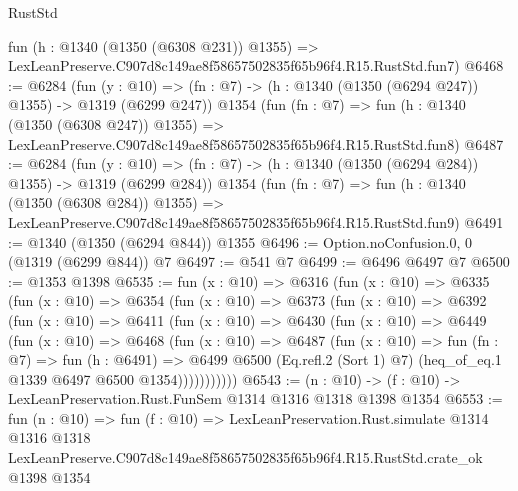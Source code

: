\begin{lexlean}{RustStd}
\begin{coremodule}
    fun (h : @1340 (@1350 (@6308 @231)) @1355) =>
    LexLeanPreserve.C907d8c149ae8f58657502835f65b96f4.R15.RustStd.fun7)
@6468 := @6284
    (fun (y : @10) => (fn : @7) -> (h : @1340 (@1350 (@6294 @247)) @1355) -> @1319 (@6299 @247))
    @1354
    (fun (fn : @7) =>
    fun (h : @1340 (@1350 (@6308 @247)) @1355) =>
    LexLeanPreserve.C907d8c149ae8f58657502835f65b96f4.R15.RustStd.fun8)
@6487 := @6284
    (fun (y : @10) => (fn : @7) -> (h : @1340 (@1350 (@6294 @284)) @1355) -> @1319 (@6299 @284))
    @1354
    (fun (fn : @7) =>
    fun (h : @1340 (@1350 (@6308 @284)) @1355) =>
    LexLeanPreserve.C907d8c149ae8f58657502835f65b96f4.R15.RustStd.fun9)
@6491 := @1340 (@1350 (@6294 @844)) @1355
@6496 := Option.noConfusion.{0, 0} (@1319 (@6299 @844)) @7
@6497 := @541 @7
@6499 := @6496 @6497 @7
@6500 := @1353 @1398
@6535 := fun (x : @10) =>
  @6316
    (fun (x : @10) =>
    @6335
      (fun (x : @10) =>
      @6354
        (fun (x : @10) =>
        @6373
          (fun (x : @10) =>
          @6392
            (fun (x : @10) =>
            @6411
              (fun (x : @10) =>
              @6430
                (fun (x : @10) =>
                @6449
                  (fun (x : @10) =>
                  @6468
                    (fun (x : @10) =>
                    @6487
                      (fun (x : @10) =>
                      fun (fn : @7) =>
                      fun (h : @6491) =>
                      @6499
                        @6500
                        (Eq.refl.{2} (Sort 1) @7)
                        (heq_of_eq.{1} @1339 @6497 @6500 @1354)))))))))))
@6543 := (n : @10) -> (f : @10) -> LexLeanPreservation.Rust.FunSem @1314 @1316 @1318 @1398 @1354
@6553 := fun (n : @10) =>
  fun (f : @10) =>
  LexLeanPreservation.Rust.simulate
    @1314
    @1316
    @1318
    LexLeanPreserve.C907d8c149ae8f58657502835f65b96f4.R15.RustStd.crate_ok
    @1398
    @1354
\end{coremodule}
\end{lexlean}
